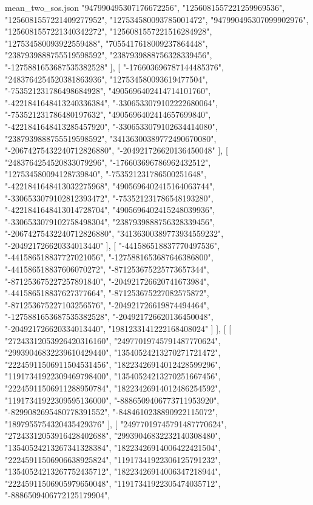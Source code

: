 \begin{filecontents*}[overwrite]{mean_two_sos.json}
    "947990495307176672256",
    "1256081557221259969536",
    "1256081557221409277952",
    "127534580093785001472",
    "947990495307099902976",
    "1256081557221340342272",
    "1256081557221516284928",
    "127534580093922559488",
    "7055417618009237864448",
    "2387939888755519598592",
    "2387939888756328339456",
    "-1275881653687535382528"
   ],
   [
    "-176603696787144485376",
    "2483764254520381863936",
    "127534580093619477504",
    "-753521231786498684928",
    "4905696402414714101760",
    "-4221841648413240336384",
    "-3306533079102222680064",
    "-753521231786480197632",
    "4905696402414657699840",
    "-4221841648413285457920",
    "-3306533079102634414080",
    "2387939888755519598592",
    "34136300389772490670080",
    "-20674275432240712826880",
    "-204921726620136450048"
   ],
   [
    "2483764254520833079296",
    "-176603696786962432512",
    "127534580094128739840",
    "-753521231786500251648",
    "-4221841648413032275968",
    "4905696402415164063744",
    "-3306533079102812393472",
    "-753521231786548193280",
    "-4221841648413014728704",
    "4905696402415248039936",
    "-3306533079102758498304",
    "2387939888756328339456",
    "-20674275432240712826880",
    "34136300389773934559232",
    "-204921726620334013440"
   ],
   [
    "-441586518837770497536",
    "-441586518837727021056",
    "-1275881653687646386800",
    "-441586518837606070272",
    "-871253675225773657344",
    "-871253675227257891840",
    "-204921726620741673984",
    "-441586518837627377664",
    "-871253675227082575872",
    "-871253675227103256576",
    "-204921726619874494464",
    "-1275881653687535382528",
    "-204921726620136450048",
    "-204921726620334013440",
    "1981233141222168408024"
   ]
  ],
  [
   [
    "27243312053926420316160",
    "24977019745791487770624",
    "29939046832239610429440",
    "13540524213270271721472",
    "22245911506911504531456",
    "18223426914012428599296",
    "11917341922309469798400",
    "13540524213270251667456",
    "22245911506911288950784",
    "18223426914012486254592",
    "11917341922309595136000",
    "-8886509406773711953920",
    "-8299082695480778391552",
    "-8484610238890922115072",
    "1897955754320435429376"
   ],
   [
    "24977019745791487770624",
    "27243312053916428402688",
    "29939046832232140308480",
    "13540524213267341328384",
    "18223426914006422421504",
    "22245911506906638925824",
    "11917341922306125791232",
    "13540524213267752435712",
    "18223426914006347218944",
    "22245911506905979650048",
    "11917341922305474035712",
    "-8886509406772125179904",

\end{filecontents*}

